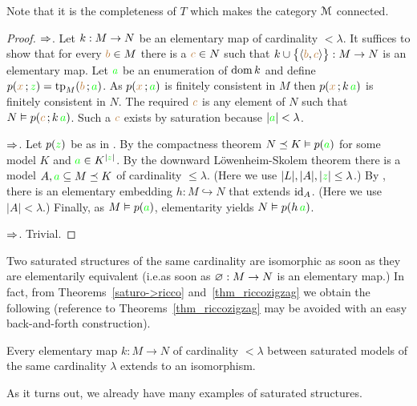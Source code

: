 \documentclass[creche.tex]{subfiles}
\begin{document}
Note that it is the completeness of $T$ which makes the category $\EuScript M$ connected.

\begin{proof}
$\Rightarrow$. Let $k:M\rightarrow N$ be an elementary map of cardinality $<\lambda$. It suffices to show that for every ${\color{brown} b}\in M$ there is a ${\color{brown} c}\in N$ such that $k\cup\big\{\langle{\color{brown}b},{\color{brown} c}\rangle\big\}:M\to N$ is an elementary map. Let ${\color{green} a}$ be an enumeration of $\mathop{\rm dom} k$ and define $p({\color{brown} x}\,;{\color{green} z})={\rm tp}_M({\color{brown} b}\,;{\color{green} a})$. As $p({\color{brown} x}\,;{\color{green} a})$ is finitely consistent in $M$ then $p({\color{brown} x}\,;k\,{\color{green} a})$ is finitely consistent in $N$. The required ${\color{brown} c}$ is any element of $N$ such that $N\vDash p({\color{brown} c}\,;k\,{\color{green} a})$. Such a ${\color{brown} c}$ exists by saturation because $|{\color{green} a}|<\lambda$.

$\Rightarrow$. Let $p({\color{green} z})$ be as in . By the compactness theorem $N\preceq K\vDash p({\color{green} a})$ for some model $K$ and ${\color{green} a}\in K^{|{\color{green} z}|}$. By the downward  L\"owenheim-Skolem theorem there is a model $A,{\color{green} a}\subseteq M\preceq K$ of cardinality $\le\lambda$. (Here we use $|L|,|A|,|{\color{green} z}|\le\lambda$.) By , there is an elementary embedding $h:M\hookrightarrow N$ that extends ${\rm id}_A$. (Here we use $|A|<\lambda$.) Finally, as $M\vDash p({\color{green} a})$,  elementarity yields $N\vDash p(h\,{\color{green} a})$.

$\Rightarrow$.  Trivial. 
\end{proof}

Two saturated structures of the same cardinality are isomorphic as soon as they are elementarily equivalent (i.e.\@ as soon as $\varnothing:M\to N$ is an elementary map.) In fact, from Theorems~\ref{saturo->ricco} and~\ref{thm_riccozigzag} we obtain the following (reference to Theorems~\ref{thm_riccozigzag} may be avoided with an easy back-and-forth construction).

\begin{corollary}
Every elementary map $k:M\to N$ of cardinality $<\lambda$ between saturated models of the same cardinality $\lambda$ extends to an isomorphism.\QED
\end{corollary}

As it turns out, we already have many examples of saturated structures.
\end{document}
